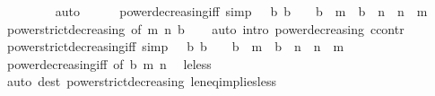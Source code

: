 \begin{isabellebody}
\ \ \ \ \ \ \ \isamarkupfalse%
\ auto\isanewline
\ \ \ \ \isamarkupfalse%
\isanewline
{}\isamarkupfalse%
%
\endisatagproof
{\isafoldproof}%
%
\isadelimproof
\isanewline
%
\endisadelimproof
\isanewline
{}\isamarkupfalse%
\ power{\isacharunderscore}{\kern0pt}decreasing{\isacharunderscore}{\kern0pt}iff\ {\isacharbrackleft}{\kern0pt}simp{\isacharbrackright}{\kern0pt}{\isacharcolon}{\kern0pt}\ {\isachardoublequoteopen}{\isasymlbrakk}{}\ {\isacharless}{\kern0pt}\ b{\isacharsemicolon}{\kern0pt}\ b\ {\isacharless}{\kern0pt}\ {}{\isasymrbrakk}\ {\isasymLongrightarrow}\ b\ {\isacharcircum}{\kern0pt}\ m\ {\isasymle}\ b\ {\isacharcircum}{\kern0pt}\ n\ {\isasymlongleftrightarrow}\ n\ {\isasymle}\ m{\isachardoublequoteclose}\isanewline
%
\isadelimproof
\ \ %
\endisadelimproof
%
\isatagproof
{}\isamarkupfalse%
\ power{\isacharunderscore}{\kern0pt}strict{\isacharunderscore}{\kern0pt}decreasing\ {\isacharbrackleft}{\kern0pt}of\ m\ n\ b{\isacharbrackright}{\kern0pt}\isanewline
\ \ \isamarkupfalse%
\ {\isacharparenleft}{\kern0pt}auto\ intro{\isacharcolon}{\kern0pt}\ power{\isacharunderscore}{\kern0pt}decreasing\ ccontr{\isacharparenright}{\kern0pt}%
\endisatagproof
{\isafoldproof}%
%
\isadelimproof
\isanewline
%
\endisadelimproof
\isanewline
{}\isamarkupfalse%
\ power{\isacharunderscore}{\kern0pt}strict{\isacharunderscore}{\kern0pt}decreasing{\isacharunderscore}{\kern0pt}iff\ {\isacharbrackleft}{\kern0pt}simp{\isacharbrackright}{\kern0pt}{\isacharcolon}{\kern0pt}\ {\isachardoublequoteopen}{\isasymlbrakk}{}\ {\isacharless}{\kern0pt}\ b{\isacharsemicolon}{\kern0pt}\ b\ {\isacharless}{\kern0pt}\ {}{\isasymrbrakk}\ {\isasymLongrightarrow}\ b\ {\isacharcircum}{\kern0pt}\ m\ {\isacharless}{\kern0pt}\ b\ {\isacharcircum}{\kern0pt}\ n\ {\isasymlongleftrightarrow}\ n\ {\isacharless}{\kern0pt}\ m{\isachardoublequoteclose}\isanewline
%
\isadelimproof
\ \ %
\endisadelimproof
%
\isatagproof
{}\isamarkupfalse%
\ power{\isacharunderscore}{\kern0pt}decreasing{\isacharunderscore}{\kern0pt}iff\ {\isacharbrackleft}{\kern0pt}of\ b\ m\ n{\isacharbrackright}{\kern0pt}\ \isamarkupfalse%
\ le{\isacharunderscore}{\kern0pt}less\isanewline
\ \ \isamarkupfalse%
\ {\isacharparenleft}{\kern0pt}auto\ dest{\isacharcolon}{\kern0pt}\ power{\isacharunderscore}{\kern0pt}strict{\isacharunderscore}{\kern0pt}decreasing\ le{\isacharunderscore}{\kern0pt}neq{\isacharunderscore}{\kern0pt}implies{\isacharunderscore}{\kern0pt}less{\isacharparenright}{\kern0pt}%

\end{isabellebody}

